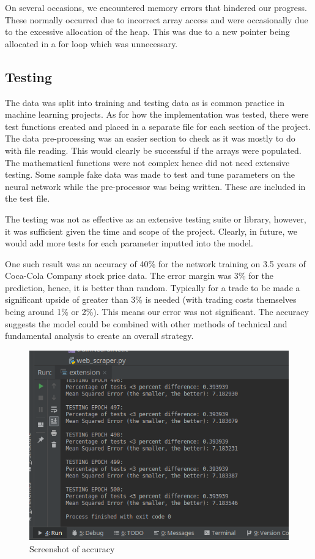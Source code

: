 \documentclass[11pt]{article}
\begin{document}
On several occasions, we encountered memory errors that hindered our progress. These normally occurred due to incorrect array access and were occasionally due to the excessive allocation of the heap. This was due to a new pointer being allocated in a for loop which was unnecessary. 

\subsection{Testing}
The data was split into training and testing data as is common practice in machine learning projects. As for how the implementation was tested, there were test functions created and placed in a separate file for each section of the project. The data pre-processing was an easier section to check as it was mostly to do with file reading. This would clearly be successful if the arrays were populated. The mathematical functions were not complex hence did not need extensive testing. Some sample fake data was made to test and tune parameters on the neural network while the pre-processor was being written. These are included in the test file. 

The testing was not as effective as an extensive testing suite or library, however, it was sufficient given the time and scope of the project. Clearly, in future, we would add more tests for each parameter inputted into the model.

One such result was an accuracy of 40\% for the network training on 3.5 years of Coca-Cola Company stock price data. The error margin was 3\% for the prediction, hence, it is better than random. Typically for a trade to be made a significant upside of greater than 3\% is needed (with trading costs themselves being around 1\% or 2\%). This means our error was not significant. The accuracy suggests the model could be combined with other methods of technical and fundamental analysis to create an overall strategy. 

\begin{figure}
\centering
\includegraphics[scale=0.5]{accuracy}
\caption{Screenshot of accuracy}
\end{figure}
\end{document}
